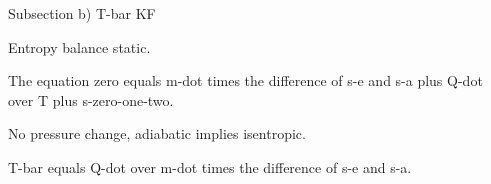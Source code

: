 Subsection b) T-bar KF

Entropy balance static.

The equation zero equals m-dot times the difference of s-e and s-a plus Q-dot over T plus s-zero-one-two.

No pressure change, adiabatic implies isentropic.

T-bar equals Q-dot over m-dot times the difference of s-e and s-a.